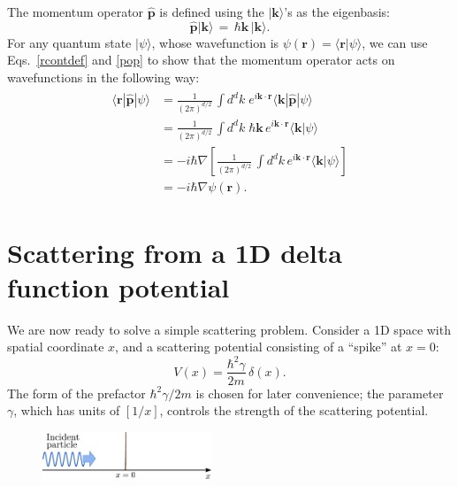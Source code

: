\documentclass[pra,12pt]{revtex4-2}
\begin{document}
The momentum operator $\hat{\mathbf{p}}$ is defined using the
$|\mathbf{k}\rangle$'s as the eigenbasis:
\begin{equation}
  \hat{\mathbf{p}} |\mathbf{k}\rangle \,=\, \hbar \mathbf{k}\, |\mathbf{k}\rangle.
  \label{pop}
\end{equation}
For any quantum state $|\psi\rangle$, whose wavefunction is
$\psi(\mathbf{r}) = \langle \mathbf{r}|\psi\rangle$, we can use
Eqs.~\eqref{rcontdef} and \eqref{pop} to show that the momentum
operator acts on wavefunctions in the following way:
\begin{align}
  \begin{aligned}\langle \mathbf{r}|\hat{\mathbf{p}}|\psi\rangle
    &= \frac{1}{(2\pi)^{d/2}} \, \int d^dk \; e^{i\mathbf{k}\cdot\mathbf{r}} \langle \mathbf{k} | \hat{\mathbf{p}} | \psi\rangle \\
    &= \frac{1}{(2\pi)^{d/2}} \, \int d^dk \; \hbar\mathbf{k} \, e^{i\mathbf{k}\cdot\mathbf{r}} \langle \mathbf{k} | \psi\rangle \\
    &= -i \hbar\nabla \left[\frac{1}{(2\pi)^{d/2}} \, \int d^dk \, e^{i\mathbf{k}\cdot\mathbf{r}} \langle \mathbf{k} | \psi\rangle \right] \\
    &= -i\hbar \nabla\psi(\mathbf{r}).
  \end{aligned}
\end{align}

\section{Scattering from a 1D delta function potential}
\label{sec:1dscatter}

We are now ready to solve a simple scattering problem.  Consider a 1D
space with spatial coordinate $x$, and a scattering potential
consisting of a ``spike'' at $x = 0$:
\begin{equation}
  V(x) = \frac{\hbar^2\gamma}{2m} \,\delta(x).
  \label{Vdeltaf}
\end{equation}
The form of the prefactor $\hbar^2\gamma/2m$ is chosen for later
convenience; the parameter $\gamma$, which has units of $[1/x]$,
controls the strength of the scattering potential.

\begin{figure}[h]
  \centering\includegraphics[width=0.45\textwidth]{scattering1d}
\end{figure}
\end{document}
